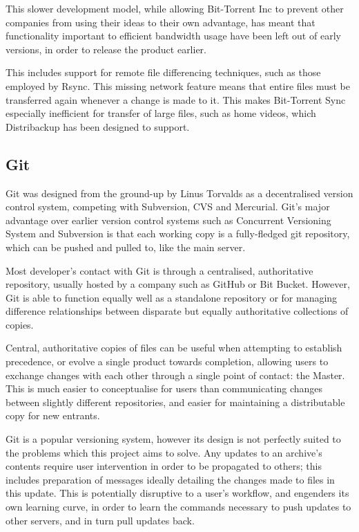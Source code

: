 \documentclass[12pt,a4paper,]{adreport}
\begin{document}
This slower development model, while allowing Bit-Torrent Inc to prevent
other companies from using their ideas to their own advantage, has meant
that functionality important to efficient bandwidth usage have been left
out of early versions, in order to release the product earlier.

This includes support for remote file differencing techniques, such as
those employed by Rsync. This missing network feature means that entire
files must be transferred again whenever a change is made to it. This
makes Bit-Torrent Sync especially inefficient for transfer of large
files, such as home videos, which Distribackup has been designed to
support.

\subsection{Git}\label{git}

Git \cite{git} was designed from the ground-up by Linus Torvalds as a decentralised
version control system, competing with Subversion, CVS and Mercurial.
Git's major advantage over earlier version control systems such as
Concurrent Versioning System and Subversion is that each working copy is
a fully-fledged git repository, which can be pushed and pulled to, like
the main server.

Most developer's contact with Git is through a centralised,
authoritative repository, usually hosted by a company such as GitHub or
Bit Bucket. However, Git is able to function equally well as a
standalone repository or for managing difference relationships between
disparate but equally authoritative collections of copies.

Central, authoritative copies of files can be useful when attempting to
establish precedence, or evolve a single product towards completion,
allowing users to exchange changes with each other through a single
point of contact: the Master. This is much easier to conceptualise for
users than communicating changes between slightly different
repositories, and easier for maintaining a distributable copy for new
entrants.

Git is a popular versioning system, however its design is not perfectly
suited to the problems which this project aims to solve. Any updates to
an archive's contents require user intervention in order to be
propagated to others; this includes preparation of messages ideally
detailing the changes made to files in this update. This is potentially
disruptive to a user's workflow, and engenders its own learning curve,
in order to learn the commands necessary to push updates to other
servers, and in turn pull updates back.
\end{document}
